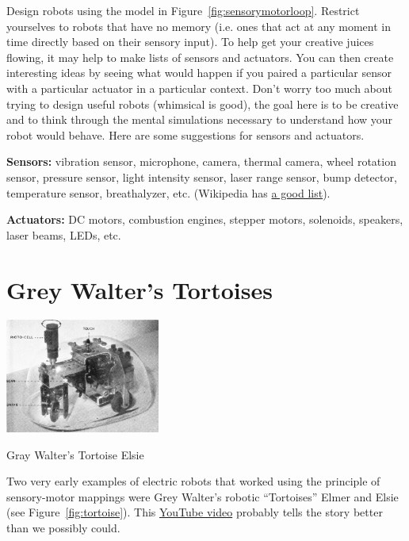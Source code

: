 \documentclass{tufte-handout}
\begin{document}
\be[resume=exercises, label=\textbf{Exercise} (\arabic*)]
\item Design robots using the model in Figure~\ref{fig:sensorymotorloop}.  Restrict yourselves to robots that have no memory (i.e. ones that act at any moment in time directly based on their sensory input).  To help get your creative juices flowing, it may help to make lists of sensors and actuators.  You can then create interesting ideas by seeing what would happen if you paired a particular sensor with a particular actuator in a particular context.  Don't worry too much about trying to design useful robots (whimsical is good), the goal here is to be creative and to think through the mental simulations necessary to understand how your robot would behave.  Here are some suggestions for sensors and actuators.

\textbf{Sensors:} vibration sensor, microphone, camera, thermal camera, wheel rotation sensor, pressure sensor, light intensity sensor, laser range sensor, bump detector, temperature sensor, breathalyzer, etc.  (Wikipedia has \href{https://en.wikipedia.org/wiki/List_of_sensors}{a good list}).

\textbf{Actuators:} DC motors, combustion engines, stepper motors, solenoids, speakers, laser beams, LEDs, etc.
\ee

\section{Grey Walter's Tortoises}
\begin{marginfigure}
\begin{center}
\includegraphics[width=2in]{Figures/WGW-Discussions-x-pics-x640.jpg}
\end{center}
\caption{Gray Walter's Tortoise Elsie\label{fig:tortoise}}
\end{marginfigure}
Two very early examples of electric robots that worked using the principle of sensory-motor mappings were Grey Walter's robotic ``Tortoises'' Elmer and Elsie (see Figure~\ref{fig:tortoise}).  This \href{https://www.youtube.com/watch?v=lLULRlmXkKo}{YouTube video} probably tells the story better than we possibly could.
\end{document}
